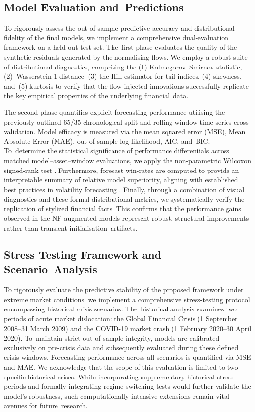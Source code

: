 \documentclass[risks,article,accept,pdftex,moreauthors]{Definitions/mdpi}
\begin{document}
\subsection{Model Evaluation and~Predictions} 

To rigorously assess the out-of-sample predictive accuracy and distributional fidelity of the final models, we implement a comprehensive dual-evaluation framework on a held-out test set. The~first phase evaluates the quality of the synthetic residuals generated by the normalising flows. We employ a robust suite of distributional diagnostics, comprising the (1) Kolmogorov--Smirnov statistic, (2)~Wasserstein-1 distance, (3) the Hill estimator for tail indices, (4) skewness, and~(5) kurtosis to verify that the flow-injected innovations successfully replicate the key empirical properties of the underlying financial~data.

The second phase quantifies explicit forecasting performance utilising the previously outlined 65/35 chronological split and rolling-window time-series cross-validation. Model efficacy is measured via the mean squared error (MSE), Mean Absolute Error (MAE), out-of-sample log-likelihood, AIC, and~BIC. To~determine the statistical significance of performance differentials across matched model–asset–window evaluations, we apply the non-parametric Wilcoxon signed-rank test \citep{demvsar2006statistical}. Furthermore, forecast win-rates are computed to provide an interpretable summary of relative model superiority, aligning with established best practices in volatility forecasting \citep{amisano2007comparing, ziel2016forecasting}. Finally, through a combination of visual diagnostics and these formal distributional metrics, we systematically verify the replication of stylized financial facts. This confirms that the performance gains observed in the NF-augmented models represent robust, structural improvements rather than transient initialisation~artifacts.

\subsection{Stress Testing Framework and Scenario~Analysis}
To rigorously evaluate the predictive stability of the proposed framework under extreme market conditions, we implement a comprehensive stress-testing protocol encompassing  historical crisis scenarios. The~historical analysis examines two periods of acute market dislocation: the Global Financial Crisis (1 September 2008--31 March 2009) and the COVID-19 market crash (1 February 2020--30 April 2020). To~maintain strict out-of-sample integrity, models are calibrated exclusively on pre-crisis data and subsequently evaluated during these defined crisis windows. Forecasting performance across all scenarios is quantified via MSE and MAE. We acknowledge that the scope of this evaluation is limited to two specific historical crises. While incorporating supplementary historical stress periods and formally integrating regime-switching tests would further validate the model's robustness, such computationally intensive extensions remain vital avenues for future~research.
\end{document}
